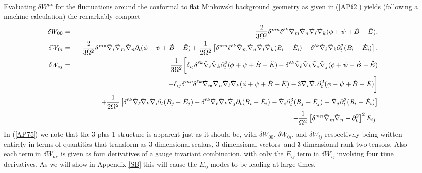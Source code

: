 \documentclass[aps]{revtex4}
\begin{document}
Evaluating $\delta W^{\mu\nu}$ for the fluctuations around the conformal to flat Minkowski background geometry as given in (\ref{AP62}) yields (following a machine calculation) the remarkably  compact
%
\begin{eqnarray}
\delta W_{00}  &=& -\frac{2}{3\Omega^2} \delta^{mn}\delta^{\ell k}\tilde{\nabla}_m\tilde{\nabla}_n\tilde{\nabla}_{\ell}\tilde{\nabla}_k (\phi + \psi +\dot{B}-\ddot{E}),
\nonumber\\	
\delta W_{0i} &=&  -\frac{2}{3\Omega^2} \delta^{mn}\tilde{\nabla}_i\tilde{\nabla}_m\tilde{\nabla}_n\partial_t(\phi +\psi +\dot{B}-\ddot{E})
	+\frac{1}{2\Omega^2}\left[\delta^{mn}\delta^{\ell k}\tilde{\nabla}_m\tilde{\nabla}_n\tilde{\nabla}_{\ell}\tilde{\nabla}_k(B_i - \dot{E}_i) -  \delta^{\ell k}\tilde{\nabla}_{\ell}\tilde{\nabla}_k \partial_t^2(B_i - \dot{E}_i)\right],
\nonumber\\	
\delta W_{ij}  &=& \frac{1}{3\Omega^2}\bigg{[} \delta_{ij}\delta^{\ell k}\tilde{\nabla}_{\ell}\tilde{\nabla}_k  \partial_t^2(\phi+ \psi+\dot{B}-\ddot{E}) + \delta^{\ell k}\tilde{\nabla}_{\ell}\tilde{\nabla}_k \tilde{\nabla}_i\tilde{\nabla}_j (\phi + \psi +\dot{B}-\ddot{E}) 
\nonumber\\
&&- \delta_{ij} \delta^{mn}\delta^{\ell k}\tilde{\nabla}_m\tilde{\nabla}_n\tilde{\nabla}_{\ell}\tilde{\nabla}_k(\phi + \psi +\dot{B}-\ddot{E}) -3\tilde{\nabla}_i\tilde{\nabla}_j \partial_t^2(\phi + \psi +\dot{B}-\ddot{E})\bigg{] }
\nonumber\\
&&+\frac{1}{2\Omega^2}\left[ \delta^{\ell k}\tilde{\nabla}_{\ell}\tilde{\nabla}_k \tilde{\nabla}_i   \partial_t(B_j - \dot{E}_j)+ \delta^{\ell k}\tilde{\nabla}_{\ell}\tilde{\nabla}_k \tilde{\nabla}_j \partial_t(B_i - \dot{E}_i) - \tilde{\nabla}_i\partial_t^3(B_j - \dot{E}_j)-\tilde{\nabla}_j\partial_t^3(B_i - \dot{E}_i)\right]
\nonumber\\
&&+\frac{1}{\Omega^2}\left[\delta^{mn}\tilde{\nabla}_m\tilde{\nabla}_n-\partial_t^2\right]^2E_{ij}.
\label{AP75}
\end{eqnarray}
%
In (\ref{AP75}) we note that the 3 plus 1 structure is apparent just as it should be, with $\delta W_{00}$, $\delta W_{0i}$,  and $\delta W_{ij}$  respectively being written entirely in terms of quantities that transform as 3-dimensional scalars, 3-dimensional vectors, and 3-dimensional rank two tensors. Also each term in $\delta W_{\mu\nu}$ is given as four derivatives of a gauge invariant combination, with only the $E_{ij}$ term in $\delta W_{ij}$ involving four time derivatives. As we will show in Appendix \ref{SB} this will cause the $E_{ij}$ modes to be leading at large times.
\end{document}

